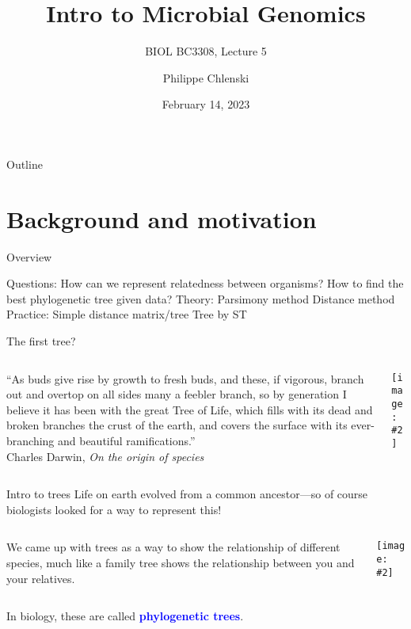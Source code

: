 \documentclass{beamer}
\title{Intro to Microbial Genomics}
\subtitle{BIOL BC3308, Lecture 5}
\author{Philippe Chlenski}
\date{February 14, 2023}
\renewcommand{\c}[1]{\begin{center}#1\end{center}}
\newcommand{\blu}[1]{\textcolor{blue}{\textbf{#1}}}
\newcommand{\gr}[2][.95]{\c{\texttt{[image: \#2]}}}
\begin{document}
\begin{frame}[plain]
\titlepage
\end{frame}

\begin{frame}{Outline}
\tableofcontents
\end{frame}

\section{Background and motivation}

\begin{frame}{Overview}
    \begin{outline}
        \1[] Questions:
            \2 How can we represent relatedness between organisms?
            \2 How to find the best phylogenetic tree given data?
        \1[] Theory:
            \2 Parsimony method
            \2 Distance method
        \1[] Practice:
            \2 Simple distance matrix/tree
            \2 Tree by ST
    \end{outline}
\end{frame}

\begin{frame}{The first tree?}
    \begin{columns}
        \begin{column}{0.7\textwidth}
            ``As buds give rise by growth to fresh buds, and these, if vigorous, branch out and overtop on all sides many a feebler branch, so by generation I believe it has been with the great Tree of Life, which fills with its dead and broken branches the crust of the earth, and covers the surface with its ever-branching and beautiful ramifications.''\\
            \bigskip
            \hfill Charles Darwin, \textit{On the origin of species}
        \end{column}
        \begin{column}{0.3\textwidth}
            \gr{l5_figs/darwin.png}
        \end{column}
    \end{columns}
\end{frame}

\begin{frame}{Intro to trees}
    Life on earth evolved from a common ancestor---so of course biologists looked for a way to represent this!\\
    \bigskip
    \begin{columns}
        \begin{column}{0.5\textwidth}
            We came up with trees as a way to show the relationship of different species, much like a family tree shows the relationship between you and your relatives.
        \end{column}
        \begin{column}{0.5\textwidth}
            \gr{l5_figs/s4_tree_archaea.png}
        \end{column}
    \end{columns}
    \bigskip
    In biology, these are called \blu{phylogenetic trees}.
\end{frame}
\end{document}
